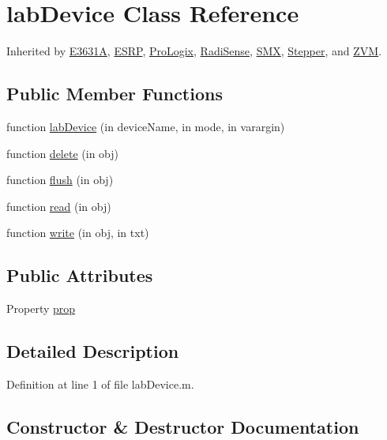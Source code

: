 \hypertarget{classlab_device}{}\section{lab\+Device Class Reference}
\label{classlab_device}


Inherited by \hyperlink{class_e3631_a}{E3631A}, \hyperlink{class_e_s_r_p}{E\+S\+RP}, \hyperlink{class_pro_logix}{Pro\+Logix}, \hyperlink{class_radi_sense}{Radi\+Sense}, \hyperlink{class_s_m_x}{S\+MX}, \hyperlink{class_stepper}{Stepper}, and \hyperlink{class_z_v_m}{Z\+VM}.

\subsection*{Public Member Functions}
\begin{DoxyCompactItemize}
\item 
function \hyperlink{classlab_device_a09e8cbad3c7eee79583b8832bb4b7db5}{lab\+Device} (in device\+Name, in mode, in varargin)
\item 
function \hyperlink{classlab_device_a7057c50fc2d4e45ec73d245b0c9492c1}{delete} (in obj)
\item 
function \hyperlink{classlab_device_ad819d668a8f3e4c20d6982c015930d93}{flush} (in obj)
\item 
function \hyperlink{classlab_device_a063e6017e5c6eee88b9dfdaf73e92c00}{read} (in obj)
\item 
function \hyperlink{classlab_device_ac25c0a57509a9ea7b776254bf505f64b}{write} (in obj, in txt)
\end{DoxyCompactItemize}
\subsection*{Public Attributes}
\begin{DoxyCompactItemize}
\item 
Property \hyperlink{classlab_device_aaabc2a46d897dc183df1647ff890ef18}{prop}
\end{DoxyCompactItemize}


\subsection{Detailed Description}


Definition at line 1 of file lab\+Device.\+m.



\subsection{Constructor \& Destructor Documentation}
\mbox{\label{classlab_device_a09e8cbad3c7eee79583b8832bb4b7db5}} 
